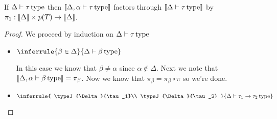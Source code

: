 \begin{lem}\label{lem:systemf:weakening}
  If $\Delta \vdash \tau\,\mathrm{type}$ then
  $\llbracket \Delta, \alpha \vdash \tau\,\mathrm{type} \rrbracket$ factors through
  $\llbracket \Delta \vdash \tau\,\mathrm{type} \rrbracket$ by
  $\pi_1 : \llbracket \Delta \rrbracket \times p(T) \to \llbracket \Delta \rrbracket$.
\end{lem}
\begin{proof}
  We proceed by induction on $\Delta \vdash \tau\,\mathrm{type}$
  \begin{itemize}
  \item
    $\inferrule{
      \beta \in \Delta
    }{\typeJ{\Delta}{\beta}}$

    In this case we know that $\beta \neq \alpha$ since
    $\alpha \not\in \Delta$. Next we note that
    $\llbracket \Delta, \alpha \vdash \beta\,\mathrm{type} \rrbracket = \pi_\beta$. Now we know
    that $\pi_\beta = \pi_\beta \circ \pi$ so we're done.
  \item
    $\inferrule{
      \typeJ{\Delta}{\tau_1}\\
      \typeJ{\Delta}{\tau_2}
    }{\typeJ{\Delta}{\tau_1 \to \tau_2}}$\\


\end{itemize}
\end{proof}
